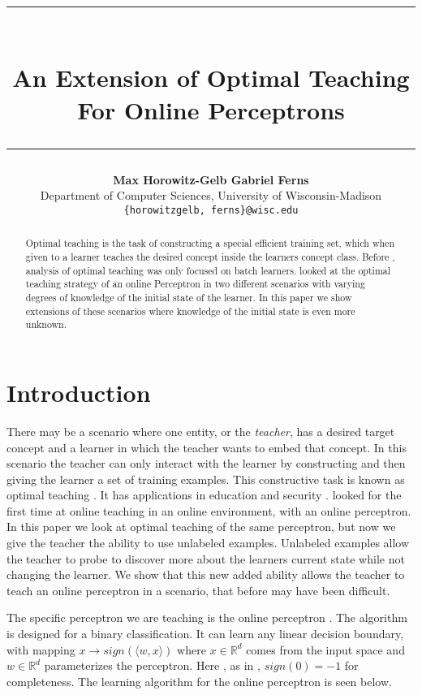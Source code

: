 \documentclass{article}
\title{\rule{350pt}{5pt}\\ \textbf{An Extension of Optimal Teaching For Online Perceptrons} \\ \rule{350pt}{1pt}}
\author{
  \textbf{Max Horowitz-Gelb \qquad Gabriel Ferns}\\
  Department of Computer Sciences, University of Wisconsin-Madison\\
  \texttt{\{horowitzgelb, ferns\}@wisc.edu}\\
}
\begin{document}

\maketitle

\begin{abstract}
  Optimal teaching is the task of constructing a special efficient training set, which when given to a learner teaches the desired concept inside the learners concept class. Before \cite{perceptron}, analysis of optimal teaching was only focused on batch learners. \cite{perceptron} looked at the optimal teaching strategy of an online Perceptron in two different scenarios with varying degrees of knowledge of the initial state of the learner. In this paper we show extensions of these scenarios where knowledge of the initial state is even more unknown.
\end{abstract}

\section{Introduction}
There may be a scenario where one entity, or the \textit{teacher},  has a desired target concept and a learner in which the teacher wants to embed that concept. In this scenario the teacher can only interact with the learner by constructing and then giving the learner a set of training examples. This constructive task is known as optimal teaching \cite{machine_teaching} \cite{teaching_dimension}. It has applications in education and security \cite{security}\cite{education} \cite{poisoning}. \cite{perceptron}\cite{td_linear} looked for the first time at online teaching in an online environment, with an online perceptron. In this paper we look at optimal teaching of the same perceptron, but now we give the teacher the ability to use unlabeled examples. Unlabeled examples allow the teacher to probe to discover more about the learners current state while not changing the learner. We show that this new added ability allows the teacher to teach an online perceptron in a scenario, that before may have been difficult.

The specific perceptron we are teaching is the  online perceptron \cite{perceptron_algo}. The algorithm is designed for a binary classification. It can learn any linear decision boundary,
with mapping $x \to sign(\langle w, x \rangle)$ where $x \in \mathbb{R}^d$ comes from the input space and $w \in \mathbb{R}^d$ parameterizes the perceptron. Here , as in \cite{perceptron}, $sign(0) = -1$ for completeness. The learning algorithm for the online perceptron is seen below.
\end{document}
